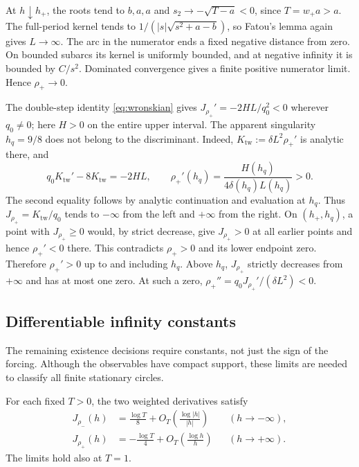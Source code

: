 At $h\downarrow h_+$, the roots tend to $b,a,a$ and
$s_2\to-\sqrt{T-a}<0$, since $T=w_+a>a$.
The full-period kernel tends to
$1/(|s|\sqrt{s^2+a-b})$, so Fatou's lemma again gives $L\to\infty$.
The arc in the numerator ends a fixed negative distance from zero.
On bounded subarcs its kernel is uniformly bounded, and at negative
infinity it is bounded by $C/s^2$.  Dominated convergence gives a
finite positive numerator limit.  Hence $\rho_+\to0$.

The double-step identity \eqref{eq:wronskian} gives
$J_{\rho_+}'=-2HL/q_0^2<0$ wherever $q_0\ne0$; here $H>0$ on
the entire upper interval.  The apparent singularity $h_q=9/8$
does not belong to the discriminant.  Indeed,
$K_{\mathrm{tw}}:=\delta L^2\rho_+'$ is analytic there, and
\begin{equation}\label{freq:apparent-point}
 q_0K_{\mathrm{tw}}'-8K_{\mathrm{tw}}=-2HL,
 \qquad
 \rho_+'(h_q)=\frac{H(h_q)}{4\delta(h_q)L(h_q)}>0.
\end{equation}
The second equality follows by analytic continuation and evaluation
at $h_q$.  Thus $J_{\rho_+}=K_{\mathrm{tw}}/q_0$ tends to
$-\infty$ from the left and $+\infty$ from the right.
On $(h_+,h_q)$, a point with $J_{\rho_+}\ge0$ would, by strict
decrease, give $J_{\rho_+}>0$ at all earlier points and hence
$\rho_+'<0$ there.  This contradicts $\rho_+>0$ and its lower
endpoint zero.  Therefore $\rho_+'>0$ up to and including $h_q$.
Above $h_q$, $J_{\rho_+}$ strictly decreases from $+\infty$ and has
at most one zero.  At such a zero,
$\rho_+''=q_0J_{\rho_+}'/(\delta L^2)<0$.

\subsection{Differentiable infinity constants}

The remaining existence decisions require constants, not just the
sign of the forcing.  Although the observables have compact support,
these limits are needed to classify all finite stationary circles.

\begin{lemma}\label{lem:infinity}
For each fixed $T>0$, the two weighted derivatives satisfy
\begin{equation}\label{eq:infinity-constants}
 \begin{aligned}
 J_{\rho_-}(h)&=\frac{\log T}{8}
       +O_T\!\left(\frac{\log|h|}{|h|}\right)&& (h\to-\infty),\\
 J_{\rho_+}(h)&=-\frac{\log T}{4}
       +O_T\!\left(\frac{\log h}{h}\right)&& (h\to+\infty).
 \end{aligned}
\end{equation}
The limits hold also at $T=1$.
\end{lemma}

